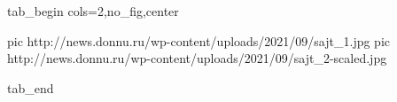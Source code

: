 
 
 
 
 


\ifcmt
  tab_begin cols=2,no_fig,center

     pic http://news.donnu.ru/wp-content/uploads/2021/09/sajt_1.jpg
		 pic http://news.donnu.ru/wp-content/uploads/2021/09/sajt_2-scaled.jpg

  tab_end
\fi
